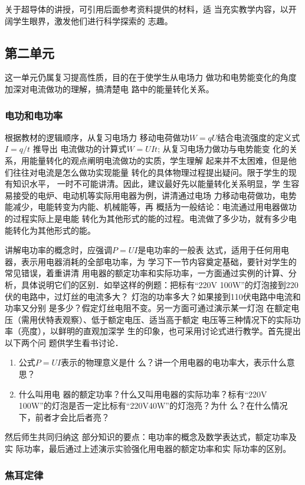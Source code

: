 关于超导体的讲授，可引用后面参考资料提供的材料，适
当充实教学内容，以开阔学生眼界，激发他们进行科学探索的
志趣。

\subsection{第二单元}
这一单元仍属复习提高性质，目的在于使学生从电场力
做功和电势能变化的角度加深对电流做功的理解，搞清楚电
路中的能量转化关系。

\subsubsection{电功和电功率}

根据教材的逻辑顺序，从复习电场力
移动电荷做功$W=qU$结合电流强度的定义式$I=q/t$
推导出
电流做功的计算式$W=UIt$; 从复习电场力做功与电势能变
化的关系，用能量转化的观点阐明电流做功的实质，学生理解
起来并不太困难，但是他们往往对电流是怎么做功实现能量
转化的具体物理过程提出疑问。限于学生的现有知识水平，
一时不可能讲清。因此，建议最好先以能量转化关系明显，学
生容易接受的电炉、电动机等实际用电器为例，讲清通过电场
力移动电荷做功，电势能减少，电能转变为内能、机械能等，再
概括为一般结论：电流通过用电器做功的过程实际上是电能
转化为其他形式的能的过程。电流做了多少功，就有多少电
能转化为其他形式的能。

讲解电功率的概念时，应强调$P=UI$是电功率的一般表
达式，适用于任何用电器，表示用电器消耗的全部电功率，为
学习下一节内容奠定基础，要针对学生的常见错误，着重讲清
用电器的额定功率和实际功率，一方面通过实例的计算、分
析，具体说明它们的区别．如举这样的例题：把标有“220V
100W”的灯泡接到220伏的电路中，过灯丝的电流多大？
灯泡的功率多大？如果接到110伏电路中电流和功率又分别
是多少？假定灯丝电阻不变。另一方面可通过演示某一灯泡
在额定电压（需用伏特表观察）、低于额定电压、适当高于额定
电压等三种情况下的实际功率（亮度），以鲜明的直观加深学
生的印象，也可采用讨论式进行教学。首先提出以下两个问
题供学生看书讨论．
\begin{enumerate}
\item 公式$P=UI$表示的物理意义是什
么？讲一个用电器的电功率大，表示什么意思？   
 \item 什么叫用电
器的额定功率？什么又叫用电器的实际功率？标有“220V
100W”的灯泡是否一定比标有“220V40W”的灯泡亮？为什
么？在什么情况下，前者才会比后者亮？
\end{enumerate}
然后师生共同归纳这
部分知识的要点：电功率的概念及数学表达式，额定功率及实
际功率，最后通过上述演示实验强化用电器的额定功率和实
际功率的区别。

\subsubsection{焦耳定律}

